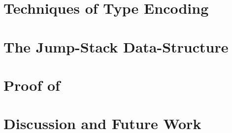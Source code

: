 \documentclass[a4paper,USenglish]{lipics}
\begin{document}
\section{Techniques of Type Encoding}
\label{Section:toolkit}


\section{The Jump-Stack Data-Structure}
\label{Section:jump}


\section{Proof of }
\label{Section:proof}


\section{Discussion and Future Work}
\label{Section:zz}


\small

\end{document}
